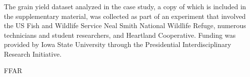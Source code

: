 

The grain yield dataset analyzed in the case study, a copy of which is
included in the supplementary material, was collected as part of an
experiment that involved the US Fish and Wildlife Service Neal Smith
National Wildlife Refuge, numerous technicians and student
researchers, and Heartland Cooperative. Funding was provided by Iowa
State University through the Presidential Interdisciplinary Research
Initiative.

FFAR

